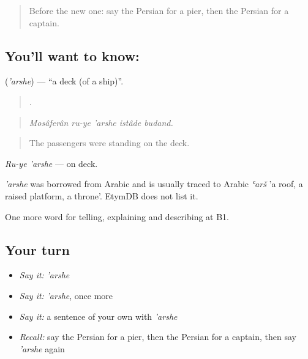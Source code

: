 \label{lesson:FA-C436-arshe}



\begin{quote}
Before the new one: say the Persian for a pier, then the Persian for a captain.
\end{quote}

\subsection*{You'll want to know: }
\textbf{} (\emph{'arshe}) — \textquotedblleft{}a deck (of a ship)\textquotedblright{}.

\begin{quote}
    .
\end{quote}

\begin{quote}
\emph{Mosâferân ru-ye 'arshe istâde budand.}
\end{quote}

\begin{quote}
The passengers were standing on the deck.
\end{quote}

\emph{Ru-ye 'arshe} — on deck.

\begin{cousinweb}
\emph{'arshe} was borrowed from Arabic and is usually traced to Arabic \emph{ʿarš} 'a roof, a raised platform, a throne'. EtymDB does not list it.
\end{cousinweb}

\begin{grammarlens}[title={What you've built}]
One more word for telling, explaining and describing at B1.
\end{grammarlens}

\subsection*{Your turn}
\begin{itemize}
\raggedright
  \item \emph{Say it:} \emph{'arshe}
  \item \emph{Say it:} \emph{'arshe}, once more
  \item \emph{Say it:} a sentence of your own with \emph{'arshe}
  \item \emph{Recall:} say the Persian for a pier, then the Persian for a captain, then say \emph{'arshe} again
\end{itemize}

